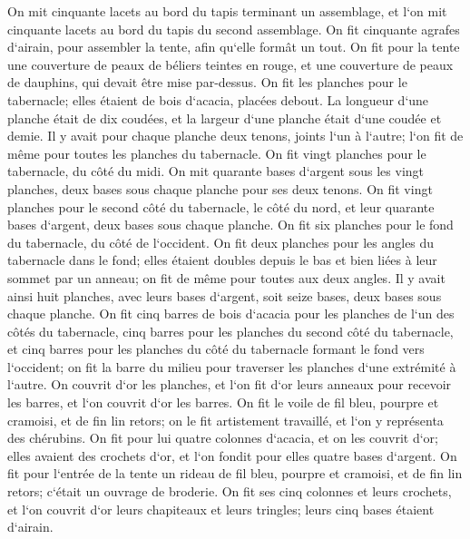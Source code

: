 \verse On mit cinquante lacets au bord du tapis terminant un assemblage, et l`on mit cinquante lacets au bord du tapis du second assemblage. 
\verse On fit cinquante agrafes d`airain, pour assembler la tente, afin qu`elle formât un tout. 
\verse On fit pour la tente une couverture de peaux de béliers teintes en rouge, et une couverture de peaux de dauphins, qui devait être mise par-dessus. 
\verse On fit les planches pour le tabernacle; elles étaient de bois d`acacia, placées debout. 
\verse La longueur d`une planche était de dix coudées, et la largeur d`une planche était d`une coudée et demie. 
\verse Il y avait pour chaque planche deux tenons, joints l`un à l`autre; l`on fit de même pour toutes les planches du tabernacle. 
\verse On fit vingt planches pour le tabernacle, du côté du midi. 
\verse On mit quarante bases d`argent sous les vingt planches, deux bases sous chaque planche pour ses deux tenons. 
\verse On fit vingt planches pour le second côté du tabernacle, le côté du nord, 
\verse et leur quarante bases d`argent, deux bases sous chaque planche. 
\verse On fit six planches pour le fond du tabernacle, du côté de l`occident. 
\verse On fit deux planches pour les angles du tabernacle dans le fond; 
\verse elles étaient doubles depuis le bas et bien liées à leur sommet par un anneau; on fit de même pour toutes aux deux angles. 
\verse Il y avait ainsi huit planches, avec leurs bases d`argent, soit seize bases, deux bases sous chaque planche. 
\verse On fit cinq barres de bois d`acacia pour les planches de l`un des côtés du tabernacle, 
\verse cinq barres pour les planches du second côté du tabernacle, et cinq barres pour les planches du côté du tabernacle formant le fond vers l`occident; 
\verse on fit la barre du milieu pour traverser les planches d`une extrémité à l`autre. 
\verse On couvrit d`or les planches, et l`on fit d`or leurs anneaux pour recevoir les barres, et l`on couvrit d`or les barres. 
\verse On fit le voile de fil bleu, pourpre et cramoisi, et de fin lin retors; on le fit artistement travaillé, et l`on y représenta des chérubins. 
\verse On fit pour lui quatre colonnes d`acacia, et on les couvrit d`or; elles avaient des crochets d`or, et l`on fondit pour elles quatre bases d`argent. 
\verse On fit pour l`entrée de la tente un rideau de fil bleu, pourpre et cramoisi, et de fin lin retors; c`était un ouvrage de broderie. 
\verse On fit ses cinq colonnes et leurs crochets, et l`on couvrit d`or leurs chapiteaux et leurs tringles; leurs cinq bases étaient d`airain. 

